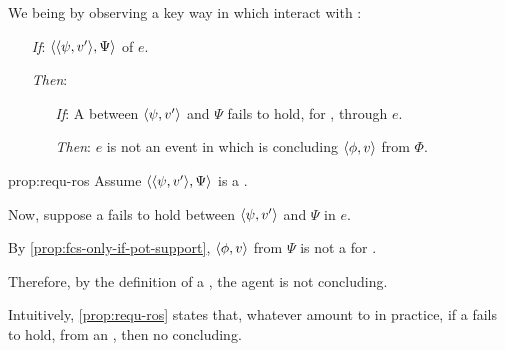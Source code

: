 \begin{note}
  We being by observing a key way in which  interact with :

  \begin{proposition}
    \label{prop:requ-ros}

    \begin{itemize}
    \item[\emph{If}:]
      \(\langle \langle \psi, v' \rangle, \Psi \rangle\) \requ{} of \(e\).
    \item[\emph{Then}:]
      \begin{itemize}
      \item[\emph{If}:]
        A \ros{} between \(\langle \psi, v' \rangle\) and \(\Psi\) fails to hold, for \vAgent{}, through \(e\).
      \item[\emph{Then}:]
        \(e\) is not an event in which \vAgent{} is concluding \(\langle \phi, v \rangle\) from \(\Phi\).
      \end{itemize}
    \end{itemize}
    \vspace{-\baselineskip}
  \end{proposition}

  \begin{argument}{prop:requ-ros}
    Assume \(\langle \langle \psi, v' \rangle, \Psi \rangle\) is a \requ{}.

    Now, suppose a \ros{} fails to hold between \(\langle \psi, v' \rangle\) and \(\Psi\) in \(e\).

    By \autoref{prop:fcs-only-if-pot-support}, \(\langle \phi, v \rangle\) from \(\Psi\) is not a \fc{} for \vAgent{}.

    Therefore, by the definition of a \requ{}, the agent is not concluding.
  \end{argument}
\end{note}

\begin{note}
  Intuitively, \autoref{prop:requ-ros} states that, whatever  amount to in practice, if a \ros{} fails to hold, from an \agpe{}, then no concluding.

\end{note}

